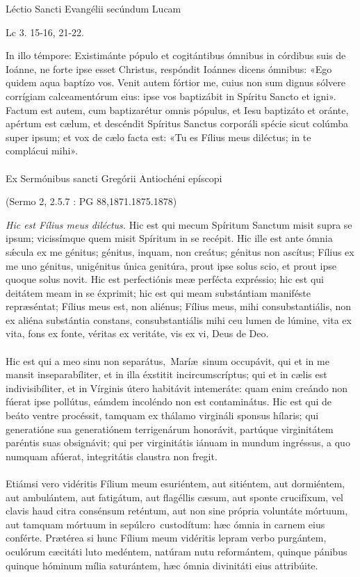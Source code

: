 \documentclass[options]{article}
\begin{document}
	Léctio Sancti Evangélii secúndum Lucam
	\begin{flushright}
		Lc 3. 15-16, 21-22.
	\end{flushright}
In illo témpore:
Existimánte pópulo et cogitántibus ómnibus in córdibus suis de Ioánne, ne forte ipse esset Christus, respóndit Ioánnes dicens ómnibus: «Ego quidem aqua baptízo vos. Venit autem fórtior me, cuius non sum dignus sólvere corrígiam calceamentórum eius: ipse vos baptizábit in Spíritu Sancto et igni».
Factum est autem, cum baptizarétur omnis pópulus, et Iesu baptizáto et oránte, apértum est cælum, et descéndit Spíritus Sanctus corporáli spécie sicut colúmba super ipsum; et vox de cælo facta est: «Tu es Fílius meus diléctus; in te complácui mihi».\\
\\
Ex Sermónibus sancti Gregórii Antiochéni epíscopi
\begin{flushright}
	(Sermo 2, 2.5.7 : PG 88,1871.1875.1878)
\end{flushright}
\emph{Hic est Fílius meus diléctus.} Hic est qui mecum Spíritum Sanctum misit supra se ipsum; vicissímque quem misit Spíritum in se recépit. Hic ille est ante ómnia s\'{æ}cula ex me génitus; génitus, inquam, non creátus; génitus non ascítus; Fílius ex me uno génitus, unigénitus única genitúra, prout ipse solus scio, et prout ipse quoque solus novit. Hic est perfectiónis meæ perfécta expréssio; hic est qui deitátem meam in se éxprimit; hic est qui meam substántiam maniféste repræséntat; Fílius meus est, non aliénus; Fílius meus, mihi consubstantiális, non ex aliéna substántia constans, consubstantiális mihi ceu lumen de lúmine, vita ex vita, fons ex fonte, véritas ex veritáte, vis ex vi, Deus de Deo.\\
\\
Hic est qui a meo sinu non separátus, Maríæ sinum occupávit, qui et in me mansit inseparabíliter, et in illa éxstitit incircumscríptus; qui et in cælis est indivisibíliter, et in Vírginis útero habitávit intemeráte: quam enim creándo non fúerat ipse pollútus, eámdem incoléndo non est contaminátus. Hic est qui de beáto ventre procéssit, tamquam ex thálamo virgináli sponsus hílaris; qui generatióne sua generatiónem terrigenárum honorávit, partúque virginitátem paréntis suas obsignávit; qui per virginitátis iánuam in mundum ingréssus, a quo numquam afúerat, integritátis claustra non fregit.\\
\\
Etiámsi vero vidéritis Fílium meum esuriéntem, aut sitiéntem, aut dormiéntem, aut ambulántem, aut fatigátum, aut flagéllis cæsum, aut sponte crucifíxum, vel clavis haud citra consénsum reténtum, aut non sine própria voluntáte mórtuum, aut tamquam mórtuum in sepúlcro custodítum: hæc ómnia in carnem eius conférte. Prætérea si hunc Fílium meum vidéritis lepram verbo purgántem, oculórum cæcitáti luto medéntem, natúram nutu reformántem, quinque pánibus quinque hóminum mília saturántem, hæc ómnia divinitáti eius attribúite.\\
\end{document}
